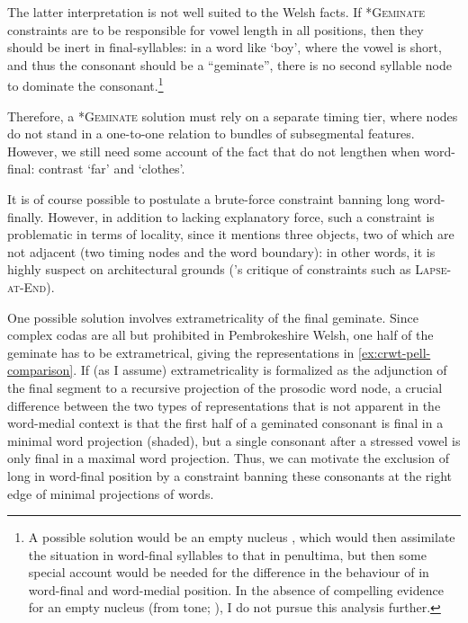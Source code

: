 The latter interpretation is not well suited to the Welsh facts. If \textsc{*Geminate} constraints are to be responsible for vowel length in all positions, then they should be inert in final\hyp syllables: in a word like \ipa{[ˈkrut]} `boy', where the vowel is short, and thus the consonant should be a \enquote{geminate}, there is no second syllable node to dominate the consonant.\footnote{A possible solution would be an empty nucleus \citep[\egm][]{kaye90,segeral01,scheer04}, which would then assimilate the situation in word\hyp final syllables to that in penultima, but then some special account would be needed for the difference in the behaviour of \ipa{[s~ʃ~ɬ]} in word\hyp final and word\hyp medial position. In the absence of compelling evidence for an empty nucleus (\eg from tone; \cf \citealt{kohnlein11:_rule}), I do not pursue this analysis further.}

Therefore, a \textsc{*Geminate} solution must rely on a separate timing tier, where nodes do not stand in a one\hyp to\hyp one relation to bundles of subsegmental features. However, we still need some account of the fact that \ipa{[s~ʃ~ɬ]} do not lengthen when word\hyp final: contrast \ipa{[ˈpeːɬ]} `far' and \ipa{[ˈdiɬad]} `clothes'.

It is of course possible to postulate a brute\hyp force constraint banning long \ipa{[s~ʃ~ɬ]} word\hyp finally. However, in addition to lacking explanatory force, such a constraint is problematic in terms of locality, since it mentions three objects, two of which are not adjacent (\ie two timing nodes and the word boundary): in other words, it is highly suspect on architectural grounds (\cf \citeauthor{buckley09:_local}'s \citeyear{buckley09:_local} critique of constraints such as \textsc{Lapse-at-End}).

One possible solution involves extrametricality of the final geminate. Since complex codas are all but prohibited in Pembrokeshire Welsh, one half of the geminate has to be extrametrical, giving the representations in \ref{ex:crwt-pell-comparison}. If (as I assume) extrametricality is formalized as the adjunction of the final segment to a recursive projection of the prosodic word node, a crucial difference between the two types of representations that is not apparent in the word\hyp medial context is that the first half of a geminated consonant is final in a minimal word projection (shaded), but a single consonant after a stressed vowel is only final in a maximal word projection. Thus, we can motivate the exclusion of long \ipa{[s~ʃ~ɬ]} in word\hyp final position by a constraint banning these consonants at the right edge of minimal projections of words.

